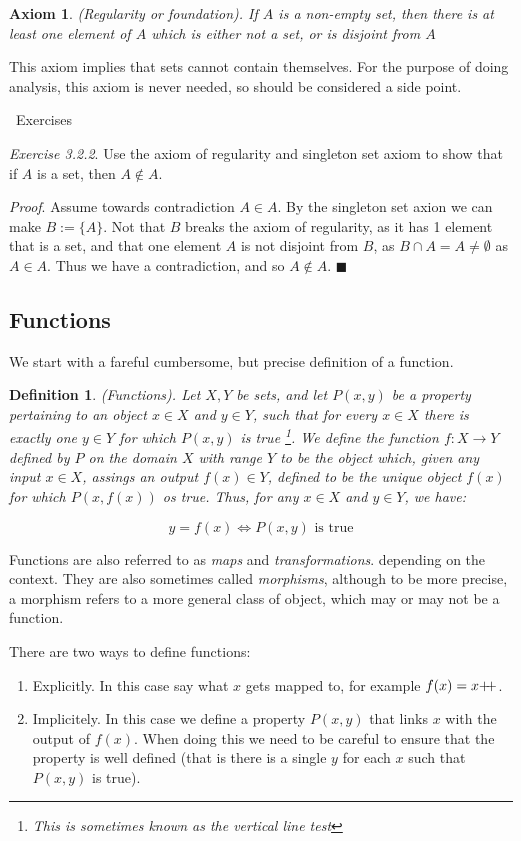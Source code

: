 \documentclass{article}
\newtheorem{definition}{Definition}[subsection]
\newtheorem{axiom}{Axiom}[section]
\newcommand{\exercisesline}{	%
    \begin{center}
    \textemdash\ Exercises\ \textemdash
    \end{center}
}
\newcommand{\pp}{\mathbin{+\mkern-5mu+}}
\let\it\textit
\begin{document}
\begin{axiom}
	(Regularity or foundation). If $A$ is a non-empty set, then
	there is at least one element of $A$ which is either not a set, 
	or is disjoint from $A$
\end{axiom}

This axiom implies that sets cannot contain themselves. For the purpose of 
doing analysis, this axiom is never needed, so should be considered a side point.

\exercisesline

\it{Exercise 3.2.2}. Use the axiom of regularity and singleton set axiom to 
show that if $A$ is a set, then $A \not \in A$.

\it{Proof}. Assume towards contradiction $A \in A$. By the singleton 
set  axion we can make $B := \{A\}$. Not that $B$ breaks the axiom 
of regularity, as it has 1 element that is a set, and that one element $A$ 
is not disjoint from $B$, as $B \cap A = A \neq \emptyset$ as $A \in A$. Thus 
we have a contradiction, and so $A \not \in A$. \hfill $\blacksquare$


\subsection{Functions}

We start with a fareful cumbersome, but precise definition of a function.

\begin{definition}
	(Functions). Let $X,Y$ be sets, and let $P(x,y)$ be 
	a property pertaining to an object $x \in X$ and $y \in Y$, such
	that for every $x \in X$ there is exactly one $y \in Y$ for which 
	$P(x,y)$ is true \footnote{This is sometimes known as the vertical
	line test}. We define the function $f: X \to Y$ defined by $P$ 
	on the domain $X$ with range $Y$ to be the object which, 
	given any input $x \in X$, assings an output $f(x) \in Y$, 
	defined to be the unique object $f(x)$ for which $P(x, f(x))$ os 
	true. Thus, for any $x \in X$ and $y \in Y$, we have: 

	$$
	y = f(x) \iff P(x,y) \text{ is true}
	$$
\end{definition}

Functions are also referred to as \it{maps} and \it{transformations}.
depending on the context. They are also sometimes called 
\it{morphisms}, although to be more precise, a morphism refers to a
more general class of object, which may or may not be a function.

There are two ways to define functions: 
\begin{enumerate}
	\item Explicitly. In this case say what $x$ gets mapped to, for example 
		$f(x) = x\pp$. 
	\item Implicitely. In this case we define a property $P(x,y)$ that 
		links $x$ with the output of $f(x)$. When doing this we 
		need to be careful to ensure that the property is well defined 
		(that is there is a single $y$ for each $x$ such that 
		$P(x,y)$ is true).
\end{enumerate}
\end{document}
